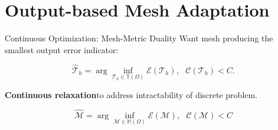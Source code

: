 \documentclass{beamer}
\newcounter{sectionframes}
\newcommand{\setsectionframes}[1]{%
  \setcounter{sectionframes}{#1}%
}
\newcounter{sectionframecount}
\begin{document}
\section{Output-based Mesh Adaptation}

\setsectionframes{3}


\begin{frame}[t]{Continuous Optimization: Mesh-Metric Duality}
\vspace{-10pt}
Want mesh producing the smallest output error indicator:

\begin{equation}
  \hat{\mathcal{T}}_h = \arg \inf_{\mathcal{T}_h \in \mathbb{T}(\Omega)} \mathcal{E}(\mathcal{T}_h),~~~\mathcal{C}(\mathcal{T}_h) < C.
\end{equation}

\textbf{Continuous relaxation}\footnotemark to address intractability of discrete problem.

\begin{equation}
  \hat{\mathcal{M}} = \arg\inf_{\mathcal{M} \in \mathbb{M}(\Omega)} \mathcal{E}(\mathcal{M}),~~~\mathcal{C}(\mathcal{M}) < C
\end{equation}



\end{frame}


\end{document}
